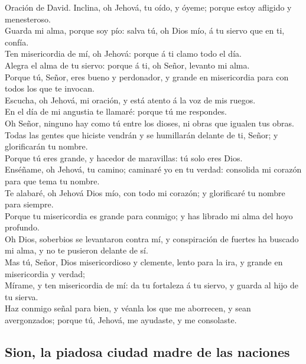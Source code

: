  Oración de David. Inclina, oh Jehová, tu oído, y óyeme;
porque estoy afligido y menesteroso.\\
 Guarda mi alma, porque soy pío: salva tú, oh Dios mío, á
tu siervo que en ti, confía.\\
 Ten misericordia de mí, oh Jehová: porque á ti clamo todo
el día.\\
 Alegra el alma de tu siervo: porque á ti, oh Señor,
levanto mi alma.\\
 Porque tú, Señor, eres bueno y perdonador, y grande en
misericordia para con todos los que te invocan.\\
 Escucha, oh Jehová, mi oración, y está atento á la voz de
mis ruegos.\\
 En el día de mi angustia te llamaré: porque tú me
respondes.\\
 Oh Señor, ninguno hay como tú entre los dioses, ni obras
que igualen tus obras.\\
 Todas las gentes que hiciste vendrán y se humillarán
delante de ti, Señor; y glorificarán tu nombre.\\
 Porque tú eres grande, y hacedor de maravillas: tú solo
eres Dios.\\
 Enséñame, oh Jehová, tu camino; caminaré yo en tu
verdad: consolida mi corazón para que tema tu nombre.\\
 Te alabaré, oh Jehová Dios mío, con todo mi corazón; y
glorificaré tu nombre para siempre.\\
 Porque tu misericordia es grande para conmigo; y has
librado mi alma del hoyo profundo.\\
 Oh Dios, soberbios se levantaron contra mí, y
conspiración de fuertes ha buscado mi alma, y no te pusieron delante de
sí.\\
 Mas tú, Señor, Dios misericordioso y clemente, lento
para la ira, y grande en misericordia y verdad;\\
 Mírame, y ten misericordia de mí: da tu fortaleza á tu
siervo, y guarda al hijo de tu sierva.\\
 Haz conmigo señal para bien, y véanla los que me
aborrecen, y sean avergonzados; porque tú, Jehová, me ayudaste, y me
consolaste.

\hypertarget{sion-la-piadosa-ciudad-madre-de-las-naciones}{%
\subsection{Sion, la piadosa ciudad madre de las
naciones}\label{sion-la-piadosa-ciudad-madre-de-las-naciones}}

